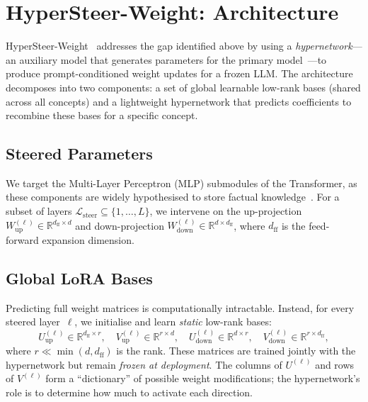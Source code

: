 \section{HyperSteer-Weight: Architecture}
\label{sec:hsw-architecture}

HyperSteer-Weight~\cite{hypersteerweight2025} addresses the gap identified above by using a \emph{hypernetwork}---an auxiliary model that generates parameters for the primary model~\cite{ha2017}---to produce prompt-conditioned weight updates for a frozen LLM. The architecture decomposes into two components: a set of global learnable low-rank bases (shared across all concepts) and a lightweight hypernetwork that predicts coefficients to recombine these bases for a specific concept.

\subsection{Steered Parameters}
\label{subsec:steered-params}

We target the Multi-Layer Perceptron (MLP) submodules of the Transformer, as these components are widely hypothesised to store factual knowledge~\cite{meng2022,dai2022}. For a subset of layers $\mathcal{L}_{\mathrm{steer}}\subseteq\{1,\ldots,L\}$, we intervene on the up-projection $W_{\mathrm{up}}^{(\ell)}\in\mathbb{R}^{d_{\mathrm{ff}}\times d}$ and down-projection $W_{\mathrm{down}}^{(\ell)}\in\mathbb{R}^{d\times d_{\mathrm{ff}}}$, where $d_{\mathrm{ff}}$ is the feed-forward expansion dimension.

\subsection{Global LoRA Bases}
\label{subsec:lora-bases}

Predicting full weight matrices is computationally intractable. Instead, for every steered layer~$\ell$, we initialise and learn \emph{static} low-rank bases:
\begin{equation}\label{eq:lora-bases}
  U_{\mathrm{up}}^{(\ell)} \in \mathbb{R}^{d_{\mathrm{ff}}\times r},\quad
  V_{\mathrm{up}}^{(\ell)} \in \mathbb{R}^{r\times d},\quad
  U_{\mathrm{down}}^{(\ell)} \in \mathbb{R}^{d\times r},\quad
  V_{\mathrm{down}}^{(\ell)} \in \mathbb{R}^{r\times d_{\mathrm{ff}}},
\end{equation}
where $r \ll \min(d, d_{\mathrm{ff}})$ is the rank. These matrices are trained jointly with the hypernetwork but remain \emph{frozen at deployment}. The columns of $U^{(\ell)}$ and rows of $V^{(\ell)}$ form a ``dictionary'' of possible weight modifications; the hypernetwork's role is to determine how much to activate each direction.


